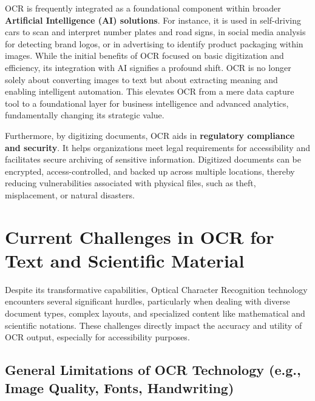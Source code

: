 OCR is frequently integrated as a foundational component within broader \textbf{Artificial Intelligence (AI) solutions}. For instance, it is used in self-driving cars to scan and interpret number plates and road signs, in social media analysis for detecting brand logos, or in advertising to identify product packaging within images. While the initial benefits of OCR focused on basic digitization and efficiency, its integration with AI signifies a profound shift. OCR is no longer solely about converting images to text but about extracting meaning and enabling intelligent automation. This elevates OCR from a mere data capture tool to a foundational layer for business intelligence and advanced analytics, fundamentally changing its strategic value.

Furthermore, by digitizing documents, OCR aids in \textbf{regulatory compliance and security}. It helps organizations meet legal requirements for accessibility and facilitates secure archiving of sensitive information. Digitized documents can be encrypted, access-controlled, and backed up across multiple locations, thereby reducing vulnerabilities associated with physical files, such as theft, misplacement, or natural disasters.

\section{Current Challenges in OCR for Text and Scientific Material}
\label{sec:ocr-challenges}

Despite its transformative capabilities, Optical Character Recognition technology encounters several significant hurdles, particularly when dealing with diverse document types, complex layouts, and specialized content like mathematical and scientific notations. These challenges directly impact the accuracy and utility of OCR output, especially for accessibility purposes.

\subsection{General Limitations of OCR Technology (e.g., Image Quality, Fonts, Handwriting)}


